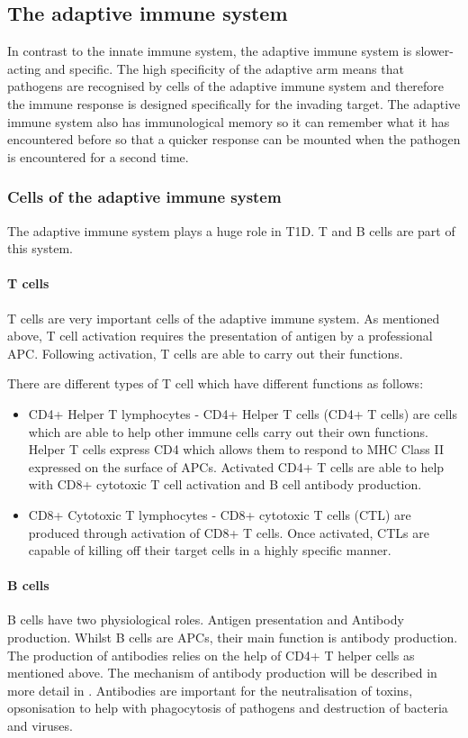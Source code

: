 \subsection{The adaptive immune system}

In contrast to the innate immune system, the adaptive immune system is slower-acting and specific.
The high specificity of the adaptive arm means that pathogens are recognised by cells of the adaptive immune system and therefore the immune response is designed specifically for the invading target.
The adaptive immune system also has immunological memory so it can remember what it has encountered before so that a quicker response can be mounted when the pathogen is encountered for a second time.

\subsubsection{Cells of the adaptive immune system}
The adaptive immune system plays a huge role in T1D.
T and B cells are part of this system.

\paragraph{T cells}
T cells are very important cells of the adaptive immune system.
As mentioned above, T cell activation requires the presentation of antigen by a professional APC.
Following activation, T cells are able to carry out their functions.

There are different types of T cell which have different functions as follows:
\begin{itemize}
\item CD4+ Helper T lymphocytes - CD4+ Helper T cells (CD4+ T cells) are cells which are able to help other immune cells carry out their own functions. 
Helper T cells express CD4 which allows them to respond to MHC Class II expressed on the surface of APCs. 
Activated CD4+ T cells are able to help with CD8+ cytotoxic T cell activation and B cell antibody production.
\item CD8+ Cytotoxic T lymphocytes - CD8+ cytotoxic T cells (CTL) are produced through activation of CD8+ T cells.
Once activated, CTLs are capable of killing off their target cells in a highly specific manner.
\end{itemize}

\paragraph{B cells}
B cells have two physiological roles.
Antigen presentation and Antibody production.
Whilst B cells are APCs, their main function is antibody production.
The production of antibodies relies on the help of CD4+ T helper cells as mentioned above.
The mechanism of antibody production will be described in more detail in .
Antibodies are important for the neutralisation of toxins, opsonisation to help with phagocytosis of pathogens and destruction of bacteria and viruses.

